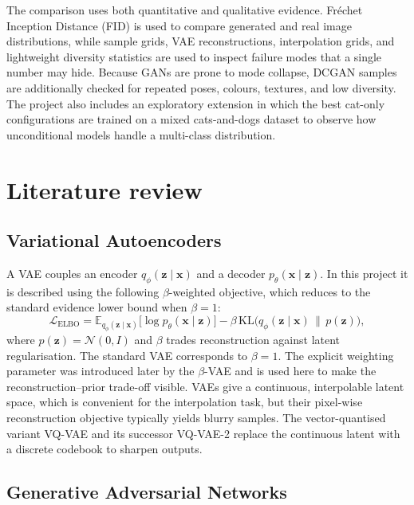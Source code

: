 \documentclass[11pt,a4paper]{article}
\begin{document}
The comparison uses both quantitative and qualitative evidence.
Fr\'echet Inception Distance (FID) is used to compare generated and real image distributions, while sample grids, VAE reconstructions, interpolation grids, and lightweight diversity statistics are used to inspect failure modes that a single number may hide.
Because GANs are prone to mode collapse, DCGAN samples are additionally checked for repeated poses, colours, textures, and low diversity.
The project also includes an exploratory extension in which the best cat-only configurations are trained on a mixed cats-and-dogs dataset to observe how unconditional models handle a multi-class distribution.

\section{Literature review}

\subsection{Variational Autoencoders}

A VAE \cite{kingma2014vae} couples an encoder $q_\phi(\mathbf{z}\mid\mathbf{x})$ and a decoder $p_\theta(\mathbf{x}\mid\mathbf{z})$. In this project it is described using the following $\beta$-weighted objective, which reduces to the standard evidence lower bound when $\beta=1$:
\begin{equation}
  \mathcal{L}_{\text{ELBO}} =
  \mathbb{E}_{q_\phi(\mathbf{z}\mid\mathbf{x})}\big[\log p_\theta(\mathbf{x}\mid\mathbf{z})\big]
  - \beta\,\mathrm{KL}\!\big(q_\phi(\mathbf{z}\mid\mathbf{x}) \,\|\, p(\mathbf{z})\big),
\end{equation}
where $p(\mathbf{z})=\mathcal{N}(0,I)$ and $\beta$ trades reconstruction against latent regularisation.
The standard VAE \cite{kingma2014vae} corresponds to $\beta=1$. The explicit weighting parameter was introduced later by the $\beta$-VAE \cite{higgins2017betavae} and is used here to make the reconstruction--prior trade-off visible.
VAEs give a continuous, interpolable latent space, which is convenient for the interpolation task, but their pixel-wise reconstruction objective typically yields blurry samples.
The vector-quantised variant VQ-VAE \cite{vandenoord2017vqvae} and its successor VQ-VAE-2 \cite{razavi2019vqvae2} replace the continuous latent with a discrete codebook to sharpen outputs.

\subsection{Generative Adversarial Networks}
\end{document}
